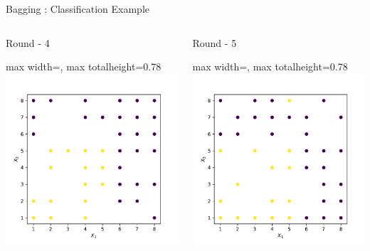 \documentclass[aspectratio=169,10pt]{beamer}
\newcommand{\fitpic}[1]{\begin{adjustbox}{max width=\linewidth, max totalheight=0.78\textheight}#1\end{adjustbox}}
\begin{document}
\begin{frame}{Bagging : Classification Example}
  \vspace{0.3cm}
  \begin{columns}
    \pause\begin{column}{0.5\textwidth}\centering
      Round - 4\\
      \fitpic{\includegraphics[width=0.9\linewidth]{../assets/ensemble/figures/dataset-rnd-3}}
    \end{column}
    \pause\begin{column}{0.5\textwidth}\centering
      Round - 5\\
      \fitpic{\includegraphics[width=0.9\linewidth]{../assets/ensemble/figures/dataset-rnd-4}}
    \end{column}
  \end{columns}
\end{frame}
\end{document}
